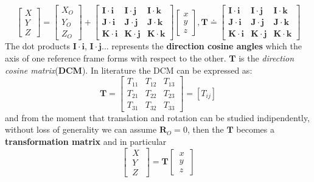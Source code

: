 \begin{equation*}
    \begin{bmatrix}
        X\\Y\\Z
    \end{bmatrix} = 
    \begin{bmatrix}
        X_O\\Y_O\\Z_O
    \end{bmatrix}+
    \begin{bmatrix}
        \mathbf{I \cdot i}&\mathbf{I \cdot j}&\mathbf{I \cdot k}\\
        \mathbf{J \cdot i}&\mathbf{J \cdot j}&\mathbf{J \cdot k}\\
        \mathbf{K \cdot i}&\mathbf{K \cdot j}&\mathbf{K \cdot  k }
    \end{bmatrix}
    \begin{bmatrix}
        x\\y\\z
    \end{bmatrix}, \mathbf{T} \doteq \begin{bmatrix}
        \mathbf{I \cdot i}&\mathbf{I \cdot j}&\mathbf{I \cdot k}\\
        \mathbf{J \cdot i}&\mathbf{J \cdot j}&\mathbf{J \cdot k}\\
        \mathbf{K \cdot i}&\mathbf{K \cdot j}&\mathbf{K \cdot  k }
    \end{bmatrix}
\end{equation*}
The dot products $\mathbf{I \cdot i}$, $\mathbf{I \cdot j}$... represents the \textbf{direction cosine angles} which the axis of one reference frame forms with respect to the other. $\mathbf{T}$ is the \textit{direction cosine matrix}(\textbf{DCM}). 
In literature the DCM can be expressed as:
\begin{equation*}
  \mathbf{T}=\begin{bmatrix}
        T_{11}&T_{12}&T_{13}\\
        T_{21}&T_{22}&T_{23}\\
        T_{31}&T_{32}&T_{33}
    \end{bmatrix}=[T_{ij}]
\end{equation*}
and from the moment that translation and rotation can be studied indipendently, without loss of generality we can assume $\mathbf{R}_O=0$, then the $\mathbf{T}$ becomes a \textbf{transformation matrix} and in particular
\begin{equation*}
    \begin{bmatrix}
        \ X \ \\ \ Y \ \\\ Z \
    \end{bmatrix} = 
    \mathbf{T} 
    \begin{bmatrix}
       \ x \ \\ \ y \ \\ \ z \
    \end{bmatrix}
\end{equation*}
